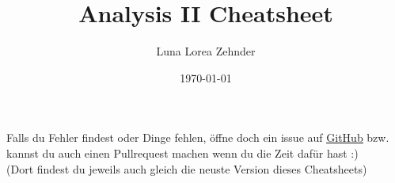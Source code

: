 \documentclass[8pt]{article}
\title{Analysis II Cheatsheet}
\author{Luna Lorea Zehnder}
\date{\today}
\begin{document}
\begin{multicols*}{3}
  
  \maketitle %
  Falls du Fehler findest oder Dinge fehlen, öffne doch ein issue auf \color{Maroon4}\href{https://github.com/LunaLorea/Analysis-II-Cheatsheet}{\underline{GitHub}}\color{defaultcolor}  \;bzw. kannst du auch einen Pullrequest machen wenn du die Zeit dafür hast :)\\
  (Dort findest du jeweils auch gleich die neuste Version dieses Cheatsheets)
  
  
  
  
\end{multicols*}
\end{document}
